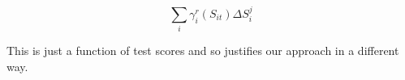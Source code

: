 \documentclass{article}
\theoremstyle{definition}
\theoremstyle{definition}
\theoremstyle{definition}
\begin{document}
\begin{equation}
    \sum_i \gamma_i^r(S_{it})  \Delta S_i^j
\end{equation}
  
  This is just a function of test scores and so justifies our approach in a different way. 




\end{document}
